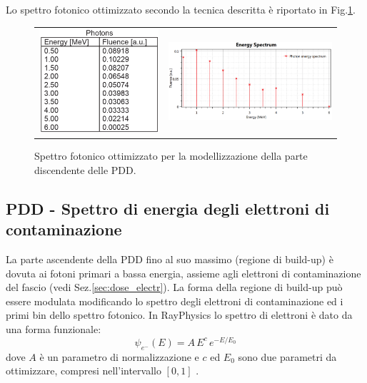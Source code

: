 Lo spettro fotonico ottimizzato secondo la tecnica descritta è riportato in Fig.\ref{fig:Ray_spectr_fot}.
\begin{figure}
\centering
\begin{tabular}{m{}m{}}
\vspace*{-0.5cm}\includegraphics[width=.32\textwidth]{./cap2/Ray_spectrum_fot_tab.png} &
\includegraphics[width=.65\textwidth]{./cap2/Ray_spectrum_fot.png}
\end{tabular}
\caption{Spettro fotonico ottimizzato per la modellizzazione della parte discendente delle PDD.}
\label{fig:Ray_spectr_fot}
\end{figure}

\subsection{PDD - Spettro di energia degli elettroni di contaminazione}
La parte ascendente della PDD fino al suo massimo (regione di build-up) è dovuta ai fotoni primari a bassa energia, assieme agli elettroni di contaminazione del fascio (vedi Sez.\ref{sec:dose_electr}). La forma della regione di build-up può essere modulata modificando lo spettro degli elettroni di contaminazione ed i primi bin dello spettro fotonico. In RayPhysics lo spettro di elettroni è dato da una forma funzionale:
\begin{equation}
\psi_{e^-} (E) = A\,E^c\, e^{-E/E_0}
\end{equation}
dove $A$ è un parametro di normalizzazione e $c$ ed $E_0$ sono due parametri da ottimizzare, compresi nell'intervallo $[0,1]$ .


